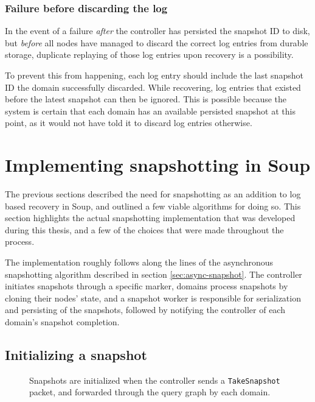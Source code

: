\documentclass[b5paper]{report}
\begin{document}
\subsubsection{Failure before discarding the log}
In the event of a failure \textit{after} the controller has persisted the
snapshot ID to disk, but \textit{before} all nodes have managed to discard the
correct log entries from durable storage, duplicate replaying of those log
entries upon recovery is a possibility.

To prevent this from happening, each log
entry should include the last snapshot ID the domain successfully discarded.
While recovering, log entries that existed before the latest snapshot can then be
ignored. This is possible because the system is certain that each domain has an
available persisted snapshot at this point, as it would not have told it to
discard log entries otherwise.

\section{Implementing snapshotting in Soup}
The previous sections described the need for snapshotting as an addition to log
based recovery in Soup, and outlined a few viable algorithms for doing so. This
section highlights the actual snapshotting implementation that was developed
during this thesis, and a few of the choices that were made throughout the
process.

The implementation roughly follows along the lines of the asynchronous
snapshotting algorithm described in section \ref{sec:async-snapshot}. The
controller initiates snapshots through a specific marker, domains process
snapshots by cloning their nodes' state, and a snapshot worker is responsible
for serialization and persisting of the snapshots, followed by notifying the
controller of each domain's snapshot completion.

\subsection{Initializing a snapshot} \label{sec:snapshot-init}
\begin{figure}[H]
  \begin{center}
    
    \caption{
      Snapshots are initialized when the controller sends a
      \texttt{TakeSnapshot} packet, and forwarded through the query graph by
      each domain. \label{fig:take-snapshot}
    }
  \end{center}
\end{figure}
\end{document}

